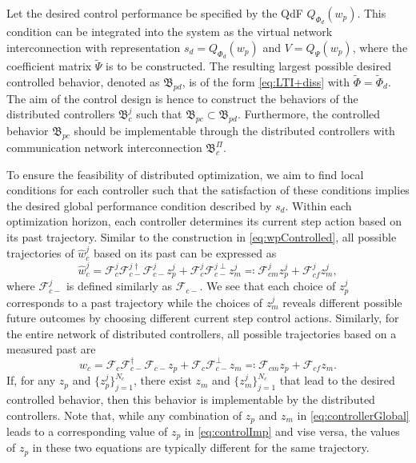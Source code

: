 \documentclass[11pt,print,draftcls,onecolumn,romanappendices]{ieeecolor}
\newcommand{\revise}[1]{{\color{black} #1}}
\newcommand{\B}{\mathfrak{B}}
\newcommand{\F}{\mathcal{F}}
\begin{document}
Let the desired control performance \revise{be} specified by the QdF $Q_{\Phi_d}(w_p)$. This condition can be integrated into the system as the virtual network interconnection with representation $s_d=Q_{\Phi_d}(w_p)$ and $V=Q_{\Psi}(w_p)$, where the coefficient matrix $\widetilde{\Psi}$ is to be constructed. The resulting largest possible desired controlled behavior, denoted as $\B_{pd}$, is of the form \eqref{eq:LTI+diss} with $\widetilde{\Phi}=\widetilde{\Phi}_d$. The aim of the control design is hence to construct the behaviors of the distributed controllers $\B_c^j$ such that $\B_{pc}\subset\B_{pd}$. \revise{Furthermore, the controlled behavior $\B_{pc}$ should be implementable through the distributed controllers with communication network interconnection $\B_c^\Pi$.} 

\revise{To ensure the feasibility of distributed optimization, we aim to find local conditions for each controller such that the satisfaction of these conditions implies the desired global performance condition described by $s_d$. Within each optimization horizon, each controller determines its current step action based on its past trajectory. Similar to the construction in \eqref{eq:wpControlled}, all possible trajectories of $\hat{w}_c^j$ based on its past can be expressed as
\begin{equation}\label{eq:controllerLocal}
    \hat{w}_c^j=\F_c^j\F_{c-}^{j\dagger}\F_{c-}^jz_p^j+\F_c^j\F_{c-}^{j\perp}z_m^j\eqqcolon\F_{cm}^jz_p^j+\F_{cf}^jz_m^j,
\end{equation}
where $\F_{c-}^j$ is defined similarly as $\F_{c-}$. We see that each choice of $z_p^j$ corresponds to a past trajectory while the choices of $z_m^j$ reveals different possible future outcomes by choosing different current step control actions. Similarly, for the entire network of distributed controllers, all possible trajectories based on a measured past are
\begin{equation}\label{eq:controllerGlobal}
    \hat{w}_c=\F_c\F_{c-}^{\dagger}\F_{c-}z_p+\F_c\F_{c-}^{\perp}z_m\eqqcolon\F_{cm}z_p+\F_{cf}z_m.
\end{equation}
If, for any $z_p$ and $\{z_p^j\}_{j=1}^{N_c}$, there exist $z_m$ and $\{z_m^j\}_{j=1}^{N_c}$ that lead to the desired controlled behavior, then this behavior is implementable by the distributed controllers. Note that, while any combination of $z_p$ and $z_m$ in \eqref{eq:controllerGlobal} leads to a corresponding value of $z_p$ in \eqref{eq:controlImp} and vise versa, the values of $z_p$ in these two equations are typically different for the same trajectory.
}
\end{document}
